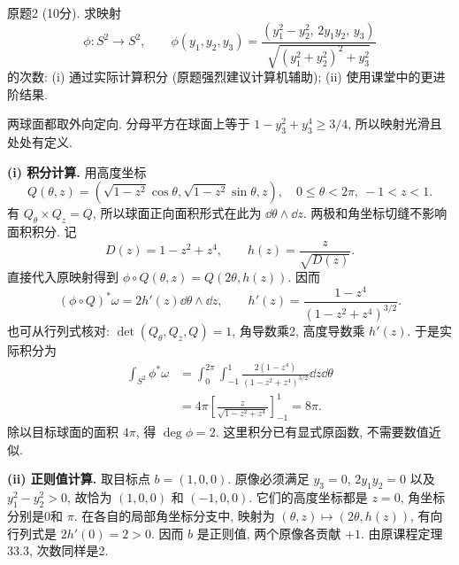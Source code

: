 \par{}
\begin{exercise}\label{ps:8-2}
原题2 (10分). 求映射
\[
 \phi:S^2\longrightarrow S^2,\qquad
 \phi(y_1,y_2,y_3)=
 \frac{(y_1^2-y_2^2,\,2y_1y_2,\,y_3)}
 {\sqrt{(y_1^2+y_2^2)^2+y_3^2}}
\]
的次数: (i) 通过实际计算积分 (原题强烈建议计算机辅助); (ii) 使用课堂中的更进阶结果.
\end{exercise}
\begin{solution}
两球面都取外向定向. 分母平方在球面上等于 $1-y_3^2+y_3^4\ge3/4$, 所以映射光滑且处处有定义.

\textbf{(i) 积分计算.} 用高度坐标
\[
 Q(\theta,z)=(\sqrt{1-z^2}\cos\theta,\sqrt{1-z^2}\sin\theta,z),
 \quad 0\le\theta<2\pi,\ -1<z<1.
\]
有 $Q_\theta\times Q_z=Q$, 所以球面正向面积形式在此为 $\dd\theta\wedge\dd z$. 两极和角坐标切缝不影响面积积分. 记
\[
 D(z)=1-z^2+z^4,\qquad h(z)=\frac z{\sqrt{D(z)}}.
\]
直接代入原映射得到 $\phi\circ Q(\theta,z)=Q(2\theta,h(z))$. 因而
\[
 (\phi\circ Q)^*\omega=2h'(z)\dd\theta\wedge\dd z,
 \qquad h'(z)=\frac{1-z^4}{(1-z^2+z^4)^{3/2}}.
\]
也可从行列式核对: $\det(Q_\theta,Q_z,Q)=1$, 角导数乘2, 高度导数乘 $h'(z)$. 于是实际积分为
\begin{align*}
 \int_{S^2}\phi^*\omega
 &=\int_0^{2\pi}\int_{-1}^1
 \frac{2(1-z^4)}{(1-z^2+z^4)^{3/2}}\dd z\dd\theta\\
 &=4\pi\left[\frac z{\sqrt{1-z^2+z^4}}\right]_{-1}^{1}
 =8\pi.
\end{align*}
除以目标球面的面积 $4\pi$, 得 $\deg\phi=2$. 这里积分已有显式原函数, 不需要数值近似.

\textbf{(ii) 正则值计算.} 取目标点 $b=(1,0,0)$. 原像必须满足 $y_3=0$, $2y_1y_2=0$ 以及 $y_1^2-y_2^2>0$, 故恰为 $(1,0,0)$ 和 $(-1,0,0)$. 它们的高度坐标都是 $z=0$, 角坐标分别是0和 $\pi$. 在各自的局部角坐标分支中, 映射为 $(\theta,z)\mapsto(2\theta,h(z))$, 有向行列式是 $2h'(0)=2>0$. 因而 $b$ 是正则值, 两个原像各贡献 $+1$. 由原课程定理33.3, 次数同样是2.
\end{solution}
